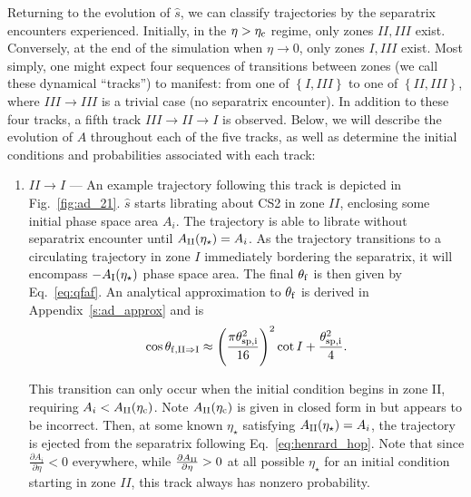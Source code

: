 \documentclass[
        fleqn,
        usenatbib,
        referee,
    ]{mnras}
\newcommand*{\pd}[2]{\frac{\partial#1}{\partial#2}}
\newcommand*{\p}[1]{\left(#1\right)}
\newcommand*{\z}[1]{\left\{#1\right\}}
\begin{document}
Returning to the evolution of $\hat{s}$, we can classify trajectories by the
separatrix encounters experienced. Initially, in the $\eta > \eta_{\rm c}$ regime,
only zones $II, III$ exist. Conversely, at the end of the simulation when $\eta
\to 0$, only zones $I, III$ exist. Most simply, one might expect four sequences
of transitions between zones (we call these dynamical ``tracks'') to manifest:
from one of $\z{I, III}$ to one of $\z{II, III}$, where $III \to III$ is a
trivial case (no separatrix encounter). In addition to these four tracks, a
fifth track $III \to II \to I$ is observed. Below, we will describe the
evolution of $A$ throughout each of the five tracks, as well as determine the
initial conditions and probabilities associated with each track:
\begin{enumerate}
    \item $II \to I$ --- An example trajectory following this track is depicted
        in Fig.~\ref{fig:ad_21}. $\hat{s}$ starts librating about CS2 in zone
        $II$, enclosing some initial phase space area $A_i$. The trajectory is
        able to librate without separatrix encounter until $A_{\rm
        II}(\eta_\star) = A_i$. As the trajectory transitions to a circulating
        trajectory in zone $I$ immediately bordering the separatrix, it will
        encompass $-A_{\rm I}(\eta_\star)$ phase space area. The final
        $\theta_{\rm f}$ is then given by Eq.~\eqref{eq:qfaf}. An analytical
        approximation to $\theta_{\rm f}$ is derived in
        Appendix~\ref{s:ad_approx} and is
        \begin{equation}
            \cos \theta_{\rm f, II \Rightarrow I} \approx
                \p{\frac{\pi \theta_{\rm sp, i}^2}{16}}^2 \cot I
                    + \frac{\theta_{\rm sp, i}^2}{4}.\label{eq:qf_21_approx}
        \end{equation}

        This transition can only occur when the initial condition begins in zone
        II, requiring $A_i < A_{\rm II}(\eta_{\rm c})$. Note $A_{\rm II}(\eta_{\rm c})$ is
        given in closed form in \citet{ward2004I} but appears to be incorrect.
        Then, at some known $\eta_\star$ satisfying $A_{\rm II}(\eta_\star) =
        A_i$, the trajectory is ejected from the separatrix following
        Eq.~\eqref{eq:henrard_hop}. Note that since $\pd{A_i}{\eta} < 0$
        everywhere, while $\pd{A_{\rm II}}{\eta} > 0$ at all possible
        $\eta_\star$ for an initial condition starting in zone $II$, this track
        always has nonzero probability.


\end{enumerate}
\end{document}
